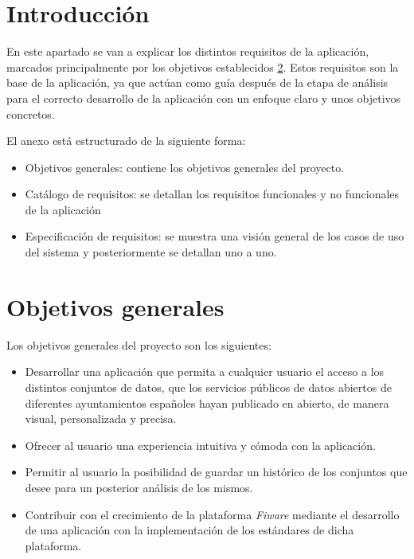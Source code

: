 
\section{Introducción}

En este apartado se van a explicar los distintos requisitos de la aplicación, marcados principalmente por los objetivos establecidos \ref{objetivos-generales}.
Estos requisitos son la base de la aplicación, ya que actúan como guía después de la etapa de análisis para el correcto desarrollo de la aplicación con un enfoque claro y unos objetivos concretos.

El anexo está estructurado de la siguiente forma:
\begin{itemize}
    \item Objetivos generales: contiene los objetivos generales del proyecto.
    \item Catálogo de requisitos: se detallan los requisitos funcionales y no funcionales de la aplicación 
    \item Especificación de requisitos: se muestra una visión general de los casos de uso del sistema y posteriormente se detallan uno a uno.
\end{itemize}

\section{Objetivos generales}\label{objetivos-generales}

Los objetivos generales del proyecto son los siguientes:

\begin{itemize}
    \item Desarrollar una aplicación que permita a cualquier usuario el acceso a los distintos conjuntos de datos, que los servicios públicos de datos abiertos de diferentes ayuntamientos españoles hayan publicado en abierto, de manera visual, personalizada y precisa.
    \item Ofrecer al usuario una experiencia intuitiva y cómoda con la aplicación.
    \item Permitir al usuario la posibilidad de guardar un histórico de los conjuntos que desee para un posterior análisis de los mismos.
    \item Contribuir con el crecimiento de la plataforma \textit{Fiware} mediante el desarrollo de una aplicación con la implementación de los estándares de dicha plataforma.

\end{itemize}

